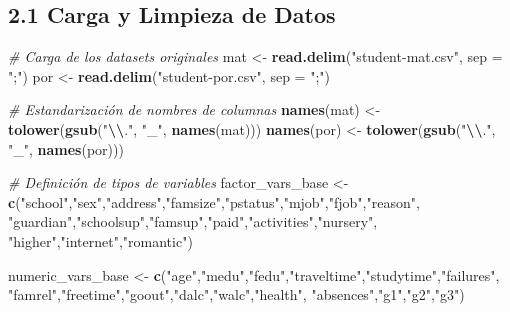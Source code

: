 \documentclass[
]{book}
\newenvironment{Shaded}{\begin{snugshade}}{\end{snugshade}}
\newcommand{\AttributeTok}[1]{\textcolor[rgb]{0.13,0.29,0.53}{#1}}
\newcommand{\CommentTok}[1]{\textcolor[rgb]{0.56,0.35,0.01}{\textit{#1}}}
\newcommand{\FunctionTok}[1]{\textcolor[rgb]{0.13,0.29,0.53}{\textbf{#1}}}
\newcommand{\NormalTok}[1]{#1}
\newcommand{\OtherTok}[1]{\textcolor[rgb]{0.56,0.35,0.01}{#1}}
\newcommand{\SpecialCharTok}[1]{\textcolor[rgb]{0.81,0.36,0.00}{\textbf{#1}}}
\newcommand{\StringTok}[1]{\textcolor[rgb]{0.31,0.60,0.02}{#1}}
\begin{document}
\subsection{2.1 Carga y Limpieza de Datos}\label{carga-y-limpieza-de-datos}

\begin{Shaded}
\begin{Highlighting}[]
\CommentTok{\# Carga de los datasets originales}
\NormalTok{mat }\OtherTok{\textless{}{-}} \FunctionTok{read.delim}\NormalTok{(}\StringTok{"student{-}mat.csv"}\NormalTok{, }\AttributeTok{sep =} \StringTok{";"}\NormalTok{)}
\NormalTok{por }\OtherTok{\textless{}{-}} \FunctionTok{read.delim}\NormalTok{(}\StringTok{"student{-}por.csv"}\NormalTok{, }\AttributeTok{sep =} \StringTok{";"}\NormalTok{)}

\CommentTok{\# Estandarización de nombres de columnas}
\FunctionTok{names}\NormalTok{(mat) }\OtherTok{\textless{}{-}} \FunctionTok{tolower}\NormalTok{(}\FunctionTok{gsub}\NormalTok{(}\StringTok{"}\SpecialCharTok{\textbackslash{}\textbackslash{}}\StringTok{."}\NormalTok{, }\StringTok{"\_"}\NormalTok{, }\FunctionTok{names}\NormalTok{(mat)))}
\FunctionTok{names}\NormalTok{(por) }\OtherTok{\textless{}{-}} \FunctionTok{tolower}\NormalTok{(}\FunctionTok{gsub}\NormalTok{(}\StringTok{"}\SpecialCharTok{\textbackslash{}\textbackslash{}}\StringTok{."}\NormalTok{, }\StringTok{"\_"}\NormalTok{, }\FunctionTok{names}\NormalTok{(por)))}

\CommentTok{\# Definición de tipos de variables}
\NormalTok{factor\_vars\_base  }\OtherTok{\textless{}{-}} \FunctionTok{c}\NormalTok{(}\StringTok{"school"}\NormalTok{,}\StringTok{"sex"}\NormalTok{,}\StringTok{"address"}\NormalTok{,}\StringTok{"famsize"}\NormalTok{,}\StringTok{"pstatus"}\NormalTok{,}\StringTok{"mjob"}\NormalTok{,}\StringTok{"fjob"}\NormalTok{,}\StringTok{"reason"}\NormalTok{,}
                       \StringTok{"guardian"}\NormalTok{,}\StringTok{"schoolsup"}\NormalTok{,}\StringTok{"famsup"}\NormalTok{,}\StringTok{"paid"}\NormalTok{,}\StringTok{"activities"}\NormalTok{,}\StringTok{"nursery"}\NormalTok{,}
                       \StringTok{"higher"}\NormalTok{,}\StringTok{"internet"}\NormalTok{,}\StringTok{"romantic"}\NormalTok{)}

\NormalTok{numeric\_vars\_base }\OtherTok{\textless{}{-}} \FunctionTok{c}\NormalTok{(}\StringTok{"age"}\NormalTok{,}\StringTok{"medu"}\NormalTok{,}\StringTok{"fedu"}\NormalTok{,}\StringTok{"traveltime"}\NormalTok{,}\StringTok{"studytime"}\NormalTok{,}\StringTok{"failures"}\NormalTok{,}
                       \StringTok{"famrel"}\NormalTok{,}\StringTok{"freetime"}\NormalTok{,}\StringTok{"goout"}\NormalTok{,}\StringTok{"dalc"}\NormalTok{,}\StringTok{"walc"}\NormalTok{,}\StringTok{"health"}\NormalTok{,}
                       \StringTok{"absences"}\NormalTok{,}\StringTok{"g1"}\NormalTok{,}\StringTok{"g2"}\NormalTok{,}\StringTok{"g3"}\NormalTok{)}


\end{Highlighting}
\end{Shaded}
\end{document}
